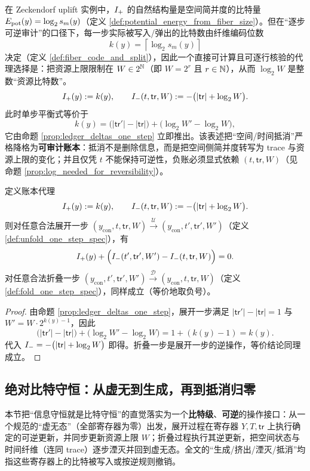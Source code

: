 \begin{remark}
在 Zeckendorf uplift 实例中，\(I_{+}\) 的自然结构量是空间简并度的比特量 \(E_{\mathrm{pot}}(y)=\log_2 s_m(y)\)（定义 \ref{def:potential_energy_from_fiber_size}）。但在“逐步可逆审计”的口径下，每一步实际被写入/弹出的比特数由纤维编码位数
$$
k(y)=\left\lceil \log_2 s_m(y)\right\rceil
$$
决定（定义 \ref{def:fiber_code_and_split}），因此一个直接可计算且可逐行核验的代理选择是：把资源上限限制在 \(W\in 2^{\mathbb{N}}\)（即 \(W=2^r\) 且 \(r\in\mathbb{N}\)），从而 \(\log_2 W\) 是整数“资源比特数”。
$$
I_{+}(y):=k(y),\qquad
I_{-}(t,\mathsf{tr},W):=-\bigl(|\mathsf{tr}|+\log_2 W\bigr).
$$
此时单步平衡式等价于
$$
k(y)=\bigl(|\mathsf{tr}'|-|\mathsf{tr}|\bigr)+\bigl(\log_2 W'-\log_2 W\bigr),
$$
它由命题 \ref{prop:ledger_deltas_one_step} 立即推出。该表述把“空间/时间抵消”严格降格为\textbf{可审计账本}：抵消不是删除信息，而是把空间侧简并度转写为 trace 与资源上限的变化；并且仅凭 \(t\) 不能保持可逆性，负账必须显式依赖 \((t,\mathsf{tr},W)\)（见命题 \ref{prop:log_needed_for_reversibility}）。
\end{remark}

\begin{proposition}\label{prop:auditable_zero_ledger_proxy}
定义账本代理
$$
I_{+}(y):=k(y),\qquad I_{-}(t,\mathsf{tr},W):=-\bigl(|\mathsf{tr}|+\log_2 W\bigr).
$$
则对任意合法展开一步 \((y_{\mathrm{con}},t,\mathsf{tr},W)\xrightarrow{\ \mathcal U\ }(y_{\mathrm{con}},t',\mathsf{tr}',W')\)（定义 \ref{def:unfold_one_step_spec}），有
$$
I_{+}(y)+\Bigl(I_{-}(t',\mathsf{tr}',W')-I_{-}(t,\mathsf{tr},W)\Bigr)=0.
$$
对任意合法折叠一步 \((y_{\mathrm{con}},t',\mathsf{tr}',W')\xrightarrow{\ \mathcal D\ }(y_{\mathrm{con}},t,\mathsf{tr},W)\)（定义 \ref{def:fold_one_step_spec}），同样成立（等价地取负号）。
\end{proposition}

\begin{proof}
由命题 \ref{prop:ledger_deltas_one_step}，展开一步满足 \(|\mathsf{tr}'|-|\mathsf{tr}|=1\) 与 \(W'=W\cdot 2^{k(y)-1}\)，因此
$$
\bigl(|\mathsf{tr}'|-|\mathsf{tr}|\bigr)+\bigl(\log_2 W'-\log_2 W\bigr)=1+(k(y)-1)=k(y).
$$
代入 \(I_{-}=-\bigl(|\mathsf{tr}|+\log_2 W\bigr)\) 即得。折叠一步是展开一步的逆操作，等价结论同理成立。
\end{proof}

\subsection{绝对比特守恒：从虚无到生成，再到抵消归零}
本节把“信息守恒就是比特守恒”的直觉落实为一个\textbf{比特级}、\textbf{可逆}的操作接口：从一个规范的“虚无态”（全部寄存器为零）出发，展开过程在寄存器 \(Y,T,\mathsf{tr}\) 上执行确定的可逆更新，并同步更新资源上限 \(W\)；折叠过程执行其逆更新，把空间状态与时间纤维（连同 trace）逐步湮灭并回到虚无态。全文的“生成/挤出/湮灭/抵消”均指这些寄存器上的比特被写入或按逆规则撤销。

